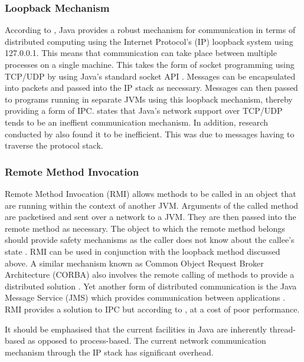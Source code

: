 \documentclass[12pt] {newrucsthesis}    %
\begin{document}
        \subsubsection{Loopback Mechanism}
          According to \cite{WellsIPCJava}, Java provides a robust mechanism for communication in terms of distributed computing using the Internet Protocol's (IP) loopback system using 127.0.0.1. This means that communication can take place between multiple processes
          on a single machine. This takes the form of socket programming using TCP/UDP by using Java's standard socket
          API \citep{taboada2013javaforHPC}. Messages can be encapsulated into packets and passed into the IP stack as
          necessary. Messages can then passed to programs running in separate JVMs using this loopback mechanism,
          thereby providing a form of IPC. \cite{taboada2013javaforHPC} states that Java's network support over TCP/UDP
          tends to be an ineffient communication mechanism. In addition, research conducted by \cite{WellsIPCMultiProc} also
          found it to be inefficient. This was due to messages having to traverse the protocol stack.

        \subsubsection{Remote Method Invocation}
          Remote Method Invocation (RMI) allows methods to be called in an object that are running within
          the context of another JVM. Arguments of the called method are packetised and sent over a network to a
          JVM. They are then passed into the remote method as necessary. The object to which the remote method belongs
          should provide safety mechanisms as the caller does not know about the callee's state \citep{JavaConcurrencyInPractice}.
          RMI can be used in conjunction with the loopback method discussed above. A similar mechanism known as Common Object
          Request Broker Architecture (CORBA) also involves the remote calling of methods to provide a distributed solution
          \citep{WellsIPCMultiProc}. Yet another form of distributed communication is the Java Message Service (JMS) which
          provides communication between applications \citep{JavaAPI}. RMI provides a solution to IPC but according to
          \cite{taboada2013javaforHPC}, at a cost of poor performance.

        It should be emphasised that the current facilities in Java are inherently thread-based as opposed to
        process-based. The current network communication mechanism through the IP stack has significant overhead.
\end{document}
